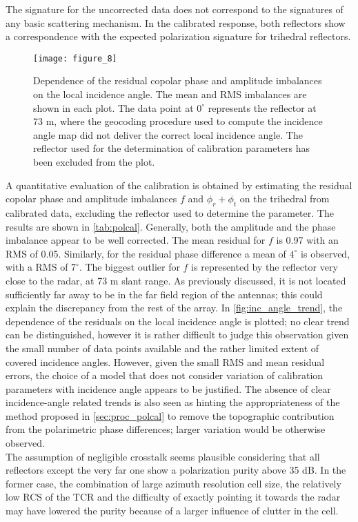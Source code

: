 The signature for the uncorrected data does not correspond to the signatures of any basic scattering mechanism. In the calibrated response, both reflectors show a correspondence with the expected polarization signature for trihedral reflectors.\\
\begin{figure*}[ht!]
	\centering
	\texttt{[image: figure\_8]}
	\caption{Dependence of the residual copolar phase and amplitude imbalances on the local incidence angle. The mean and RMS imbalances are shown in each plot. The data point at $0^\circ$ represents the reflector at 73 m, where the geocoding procedure used to compute the incidence angle map did not deliver the correct  local incidence angle. The reflector used for the determination of calibration parameters has been excluded from the plot.}
	\label{fig:inc_angle_trend}
\end{figure*}
A quantitative evaluation of the calibration is obtained by estimating the residual copolar phase and amplitude imbalances $f$ and $\phi_r + \phi_t$ on the trihedral from calibrated data, excluding the reflector used to determine the parameter. The results are shown in \autoref{tab:polcal}. Generally, both the amplitude and the phase imbalance appear to be well corrected. The mean residual for $f$ is 0.97 with an RMS of 0.05. Similarly, for the residual phase difference a mean of $4^\circ$ is observed, with a RMS of $7^\circ$. The biggest outlier for $f$ is represented by the reflector very close to the radar, at 73 m slant range. As previously discussed, it is not located sufficiently far away to be in the far field region of the antennas; this could explain the discrepancy from the rest of the array.
In \autoref{fig:inc_angle_trend}, the dependence of the residuals on the local incidence angle is plotted; no clear trend can be distinguished, however it is rather difficult to judge this observation given the small number of data points available and the rather limited extent of covered incidence angles. However, given the small RMS and mean residual errors, the choice of a model that does not consider variation of calibration parameters with incidence angle appears to be justified. The absence of clear incidence-angle related trends is also seen as hinting the appropriateness of the method proposed in \autoref{sec:proc_polcal} to remove the topographic contribution from the polarimetric phase differences; larger variation would be otherwise observed.\\
The assumption of negligible crosstalk seems plausible considering that all reflectors  except the very far one show a polarization purity above 35 dB. In the former case, the combination of large azimuth resolution cell size, the relatively low RCS of the TCR and  the difficulty of exactly pointing it towards the radar may have lowered the purity because of a larger influence of clutter in the cell.




